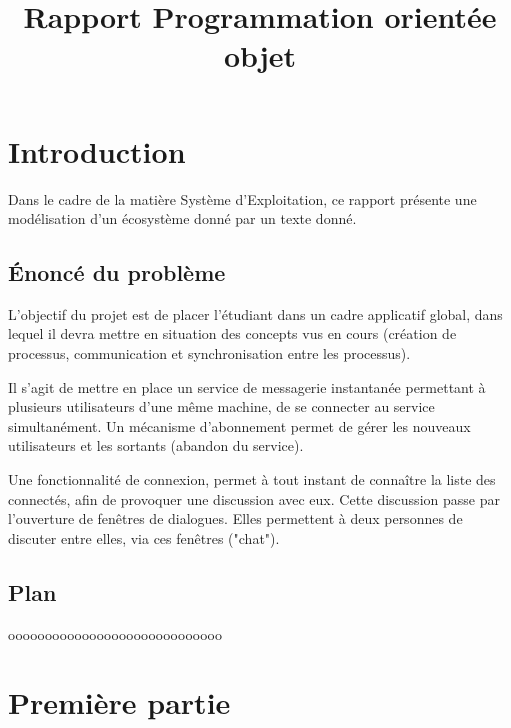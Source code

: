 \documentclass{rapport}
\title{Rapport Programmation orientée objet} %
\begin{document}



        
\fairemarges %
\fairepagedegarde %
\tabledematieres %

\section{Introduction}
Dans le cadre de la matière Système d'Exploitation, ce rapport présente une modélisation d'un écosystème donné par un texte donné.
\subsection{Énoncé du problème}

L'objectif du projet est de placer l'étudiant dans un cadre applicatif global, dans lequel il devra mettre en situation des concepts vus en cours (création de processus, communication et synchronisation entre les processus).

Il s'agit de mettre en place un service de messagerie instantanée permettant à plusieurs utilisateurs d'une même machine, de se connecter au service simultanément. Un mécanisme d'abonnement permet de gérer les nouveaux utilisateurs et les sortants (abandon du service).

Une fonctionnalité de connexion, permet à tout instant de connaître la liste des connectés, afin de provoquer une discussion avec eux. Cette discussion passe par l'ouverture de fenêtres de dialogues. Elles permettent à deux personnes de discuter entre elles, via ces fenêtres ("chat").

\subsection{Plan}

ooooooooooooooooooooooooooooo

\newpage
\section{Première partie} 
\end{document}
